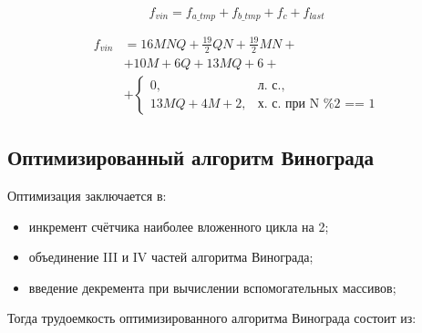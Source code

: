 \begin{equation}
	\label{for:vin0}
	f_{vin} =  f_{a\_tmp} + f_{b\_tmp} + f_{c} + f_{last}
\end{equation}

\begin{equation}
\begin{aligned}
	\label{for:vin}
	f_{vin} &=  16MNQ + \frac{19}{2}QN + \frac{19}{2}MN + \\
	&+ 10M + 6Q + 13MQ + 6 + \\
	&+ \begin{cases}
		0, & \text{л. с.,}\\
		13MQ + 4M + 2, & \text{х. с. при N \% 2 == 1}
	\end{cases}
\end{aligned}
\end{equation}

\subsection{Оптимизированный алгоритм Винограда}

Оптимизация заключается в:
\begin{itemize}
	\item инкремент счётчика наиболее вложенного цикла на 2;
	\item объединение III и IV частей алгоритма Винограда;
	\item введение декремента при вычислении вспомогательных массивов;
\end{itemize}

Тогда трудоемкость оптимизированного алгоритма Винограда состоит из:

